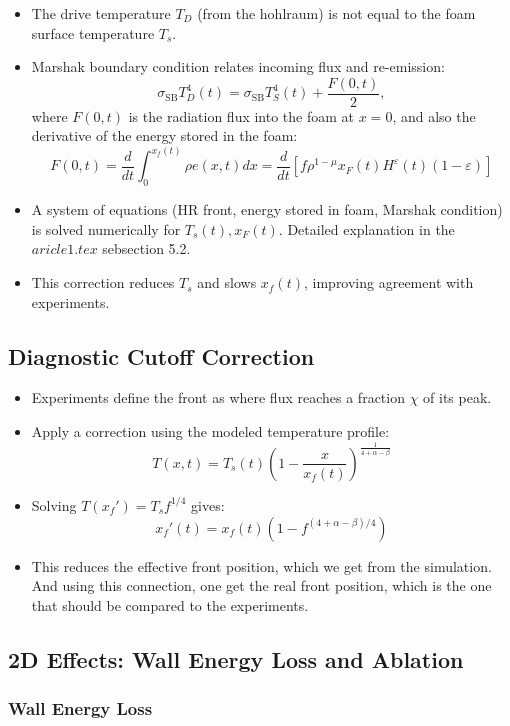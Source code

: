 \documentclass{article}
\begin{document}
\begin{itemize}
    \item The drive temperature $T_D$ (from the hohlraum) is not equal to the foam surface temperature $T_s$.
    \item Marshak boundary condition relates incoming flux and re-emission:
    \[
    \sigma_{\mathrm{SB}}T_D^4(t)
    = \sigma_{\mathrm{SB}}T_S^4(t)+\frac{F(0,t)}{2},
    \]
    where $F(0,t)$ is the radiation flux into the foam at $x=0$, and also the derivative of the energy stored in the foam: 
    \[
    F(0,t) = \frac{d}{dt} \int_0^{x_f(t)} \rho e(x,t) dx = \frac{d}{dt} \left[f \rho^{1-\mu} x_F(t) H^{\varepsilon}(t)(1-\varepsilon)\right]
    \]
    \item A system of equations (HR front, energy stored in foam, Marshak condition) is solved numerically for $T_s(t), x_F(t)$. Detailed explanation in the $aricle1.tex$ sebsection 5.2.
    \item This correction reduces $T_s$ and slows $x_f(t)$, improving agreement with experiments.
\end{itemize}

\subsection{Diagnostic Cutoff Correction}

\begin{itemize}
    \item Experiments define the front as where flux reaches a fraction $\chi$ of its peak.
    \item Apply a correction using the modeled temperature profile:
    \[
    T(x,t) = T_s(t) \left(1 - \frac{x}{x_f(t)} \right)^{\frac{1}{4+\alpha - \beta}}
    \]
    \item Solving $T(x_f') = T_s f^{1/4}$ gives:
    \[
    x_f'(t) = x_f(t) \left(1 - f^{(4+\alpha - \beta)/4} \right)
    \]
    \item This reduces the effective front position, which we get from the simulation. And using this connection, one get the real front position, which is the one that should be compared to the experiments.
\end{itemize}

\subsection{2D Effects: Wall Energy Loss and Ablation}

\subsubsection*{Wall Energy Loss}
\end{document}
